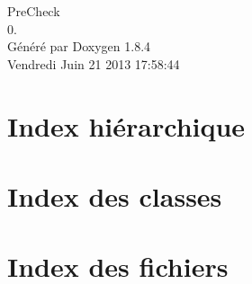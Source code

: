 \documentclass[twoside]{book}
\newcommand{\clearemptydoublepage}{%
  \newpage{\pagestyle{empty}\cleardoublepage}%
}
\begin{document}
\hypersetup{pageanchor=false}
\begin{titlepage}
\vspace*{7cm}
\begin{center}%
{\Large Pre\-Check \\[1ex]\large 0. }\\
\vspace*{1cm}
{\large Généré par Doxygen 1.8.4}\\
\vspace*{0.5cm}
{\small Vendredi Juin 21 2013 17:58:44}\\
\end{center}
\end{titlepage}
\clearemptydoublepage
\tableofcontents
\clearemptydoublepage
{}
\hypersetup{pageanchor=true}

\chapter{Index hiérarchique}

\chapter{Index des classes}

\chapter{Index des fichiers}

\end{document}
